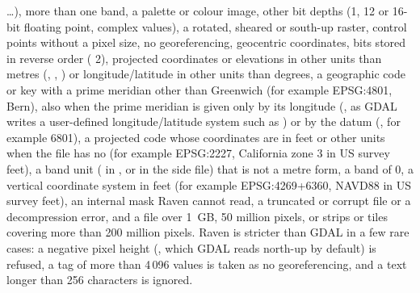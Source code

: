 \dots), more than one band, a palette or colour image, other bit depths (1, 12 or 16-bit floating point, complex values),
a rotated, sheared or south-up raster, control points without a pixel size, no georeferencing, geocentric coordinates,
bits stored in reverse order ( 2), projected coordinates or elevations in other units than metres
(, , ) or longitude/latitude in other units
than degrees, a geographic code or key with a prime meridian other than Greenwich (for example EPSG:4801, Bern), also
when the prime meridian is given only by its longitude (, as GDAL writes a user-defined
longitude/latitude system such as ) or by the datum (, for example 6801), a
projected code whose coordinates are in feet or other units when the file has no  (for example
EPSG:2227, California zone 3 in US survey feet), a band unit ( in , or
 in the side file) that is not a metre form, a band  of 0, a
vertical coordinate system in feet (for example EPSG:4269+6360, NAVD88 in US survey feet), an internal mask Raven cannot
read, a truncated or corrupt file or a decompression error, and a file over 1~GB, 50 million pixels, or strips or tiles
covering more than 200 million pixels. Raven is stricter than GDAL in a few rare cases: a negative pixel height
(, which GDAL reads north-up by default) is refused, a  tag of more than 4\,096
values is taken as no georeferencing, and a  text longer than 256 characters is ignored.

